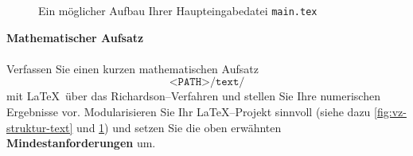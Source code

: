 \begin{figure}[h!]
	\hspace*{0.5cm}\\
	\hspace*{0.5cm}\\
	~\\
	\hspace*{0.5cm}\\
	\hspace*{0.5cm}\\
	\hspace*{0.5cm}\\
	\hspace*{0.5cm}\\
	\hspace*{0.5cm}\\
	~\\
	\hspace*{0.5cm}\\
	\hspace*{0.5cm}\\
	\hspace*{0.5cm}\\
	\hspace*{0.5cm}\\
	\hspace*{0.5cm}\ttt{\color{gray} \% }\\
	\hspace*{0.5cm} \\
	\caption{Ein möglicher Aufbau Ihrer Haupteingabedatei \texttt{main.tex}}
	\label{fig:main.tex}
\end{figure}



\textbf{Mathematischer Aufsatz }\\
~\\Verfassen Sie einen kurzen mathematischen Aufsatz
$$	 \texttt{<PATH>/text/} $$
mit \LaTeX~über das Richardson--Verfahren und stellen Sie Ihre numerischen Ergebnisse vor. Modularisieren Sie Ihr \LaTeX--Projekt sinnvoll (siehe dazu \ref{fig:vz-struktur-text} und \ref{fig:main.tex}) und setzen Sie die oben erwähnten \textbf{Mindestanforderungen} um. \\

